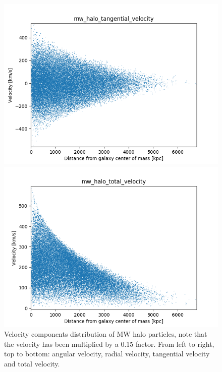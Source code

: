 \documentclass[a4paper,12pt, english]{article}
\begin{document}
\begin{figure}
\begin{minipage}{0.45\textwidth}
\includegraphics[width=1\textwidth]{VelocityDistr/mw_halo_tangential_velocity.png}
\end{minipage}
\begin{minipage}{0.45\textwidth}
  \centering
\includegraphics[width=1\textwidth]{VelocityDistr/mw_halo_total_velocity.png}
\end{minipage}
\caption{Velocity components distribution of MW halo particles, note that the velocity has been multiplied by a 0.15 factor. From left to right, top to bottom: angular velocity, radial velocity, tangential velocity and total velocity.}
\label{fig:halo-vel}
\end{figure}
\clearpage
\end{document}
